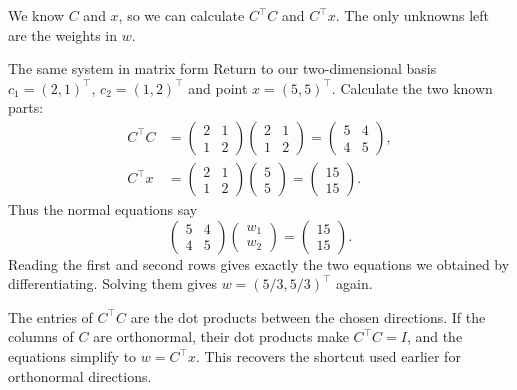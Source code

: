 \documentclass[a4paper,12pt,oneside]{report}
\begin{document}
We know $C$ and $x$, so we can calculate $C^\top C$ and $C^\top x$.
The only unknowns left are the weights in $w$.

\begin{framedexample}{The same system in matrix form}
Return to our two-dimensional basis $c_1=(2,1)^\top$,
$c_2=(1,2)^\top$ and point $x=(5,5)^\top$.
Calculate the two known parts:
\[
\begin{aligned}
  C^\top C
    &=\begin{pmatrix}2&1\\1&2\end{pmatrix}
      \begin{pmatrix}2&1\\1&2\end{pmatrix}
      =\begin{pmatrix}5&4\\4&5\end{pmatrix},\\[6pt]
  C^\top x
    &=\begin{pmatrix}2&1\\1&2\end{pmatrix}
      \begin{pmatrix}5\\5\end{pmatrix}
      =\begin{pmatrix}15\\15\end{pmatrix}.
\end{aligned}
\]
Thus the normal equations say
\[
  \begin{pmatrix}5&4\\4&5\end{pmatrix}
  \begin{pmatrix}w_1\\w_2\end{pmatrix}
  =\begin{pmatrix}15\\15\end{pmatrix}.
\]
Reading the first and second rows gives exactly the two equations
we obtained by differentiating. Solving them gives
$w=(5/3,5/3)^\top$ again.
\end{framedexample}

The entries of $C^\top C$ are the dot products between the chosen
directions. If the columns of $C$ are orthonormal, their dot products
make $C^\top C=I$, and the equations simplify to $w=C^\top x$.
This recovers the shortcut used earlier for orthonormal directions.
\end{document}
